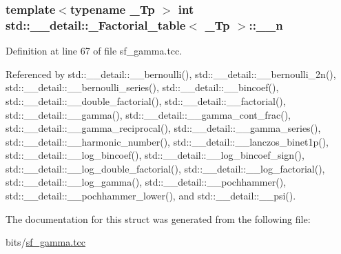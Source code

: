 \subsubsection[{\texorpdfstring{\+\_\+\+\_\+n}{__n}}]{\setlength{\rightskip}{0pt plus 5cm}template$<$typename \+\_\+\+Tp $>$ int {\bf std\+::\+\_\+\+\_\+detail\+::\+\_\+\+Factorial\+\_\+table}$<$ \+\_\+\+Tp $>$\+::\+\_\+\+\_\+n}\hypertarget{structstd_1_1____detail_1_1__Factorial__table_a08dfe7484fca4bcdd1969ce2fa73edc6}{}\label{structstd_1_1____detail_1_1__Factorial__table_a08dfe7484fca4bcdd1969ce2fa73edc6}


Definition at line 67 of file sf\+\_\+gamma.\+tcc.



Referenced by std\+::\+\_\+\+\_\+detail\+::\+\_\+\+\_\+bernoulli(), std\+::\+\_\+\+\_\+detail\+::\+\_\+\+\_\+bernoulli\+\_\+2n(), std\+::\+\_\+\+\_\+detail\+::\+\_\+\+\_\+bernoulli\+\_\+series(), std\+::\+\_\+\+\_\+detail\+::\+\_\+\+\_\+bincoef(), std\+::\+\_\+\+\_\+detail\+::\+\_\+\+\_\+double\+\_\+factorial(), std\+::\+\_\+\+\_\+detail\+::\+\_\+\+\_\+factorial(), std\+::\+\_\+\+\_\+detail\+::\+\_\+\+\_\+gamma(), std\+::\+\_\+\+\_\+detail\+::\+\_\+\+\_\+gamma\+\_\+cont\+\_\+frac(), std\+::\+\_\+\+\_\+detail\+::\+\_\+\+\_\+gamma\+\_\+reciprocal(), std\+::\+\_\+\+\_\+detail\+::\+\_\+\+\_\+gamma\+\_\+series(), std\+::\+\_\+\+\_\+detail\+::\+\_\+\+\_\+harmonic\+\_\+number(), std\+::\+\_\+\+\_\+detail\+::\+\_\+\+\_\+lanczos\+\_\+binet1p(), std\+::\+\_\+\+\_\+detail\+::\+\_\+\+\_\+log\+\_\+bincoef(), std\+::\+\_\+\+\_\+detail\+::\+\_\+\+\_\+log\+\_\+bincoef\+\_\+sign(), std\+::\+\_\+\+\_\+detail\+::\+\_\+\+\_\+log\+\_\+double\+\_\+factorial(), std\+::\+\_\+\+\_\+detail\+::\+\_\+\+\_\+log\+\_\+factorial(), std\+::\+\_\+\+\_\+detail\+::\+\_\+\+\_\+log\+\_\+gamma(), std\+::\+\_\+\+\_\+detail\+::\+\_\+\+\_\+pochhammer(), std\+::\+\_\+\+\_\+detail\+::\+\_\+\+\_\+pochhammer\+\_\+lower(), and std\+::\+\_\+\+\_\+detail\+::\+\_\+\+\_\+psi().



The documentation for this struct was generated from the following file\+:\begin{DoxyCompactItemize}
\item 
bits/\hyperlink{sf__gamma_8tcc}{sf\+\_\+gamma.\+tcc}\end{DoxyCompactItemize}

